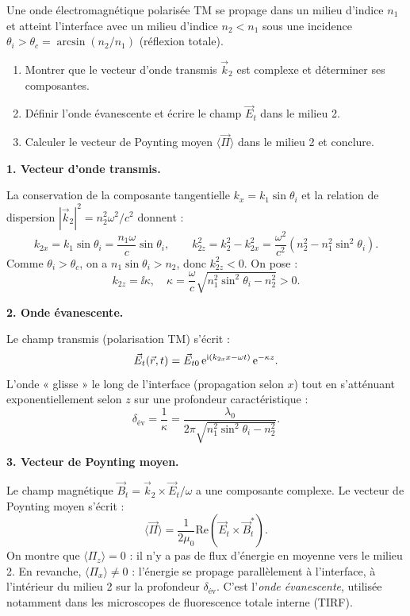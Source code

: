\documentclass[12pt,a4paper]{article}
\begin{document}
\begin{boiteexercice}
Une onde électromagnétique polarisée TM se propage dans un milieu d'indice $n_1$ et atteint l'interface avec un milieu d'indice $n_2 < n_1$ sous une incidence $\theta_i > \theta_c = \arcsin(n_2/n_1)$ (réflexion totale).
\begin{enumerate}
  \item Montrer que le vecteur d'onde transmis $\vec{k}_2$ est complexe et déterminer ses composantes.
  \item Définir l'onde évanescente et écrire le champ $\vec{E}_t$ dans le milieu 2.
  \item Calculer le vecteur de Poynting moyen $\langle\vec{\Pi}\rangle$ dans le milieu 2 et conclure.
\end{enumerate}
\end{boiteexercice}

\begin{boitecorrige}

\textbf{1. Vecteur d'onde transmis.}

La conservation de la composante tangentielle $k_x = k_1\sin\theta_i$ et la relation de dispersion $|\vec{k}_2|^2 = n_2^2 \omega^2/c^2$ donnent :
\[
k_{2x} = k_1\sin\theta_i = \frac{n_1\omega}{c}\sin\theta_i, \qquad k_{2z}^2 = k_2^2 - k_{2x}^2 = \frac{\omega^2}{c^2}(n_2^2 - n_1^2\sin^2\theta_i).
\]
Comme $\theta_i > \theta_c$, on a $n_1\sin\theta_i > n_2$, donc $k_{2z}^2 < 0$. On pose :
\[
k_{2z} = \ii\kappa, \quad \kappa = \frac{\omega}{c}\sqrt{n_1^2\sin^2\theta_i - n_2^2} > 0.
\]

\textbf{2. Onde évanescente.}

Le champ transmis (polarisation TM) s'écrit :
\[
\vec{E}_t(\vec{r},t) = \vec{E}_{t0}\,\mathrm{e}^{\mathrm{i}(k_{2x}x-\omega t)}\,\mathrm{e}^{-\kappa z}.
\]
L'onde « glisse » le long de l'interface (propagation selon $x$) tout en s'atténuant exponentiellement selon $z$ sur une profondeur caractéristique :
\[
\delta_\text{év} = \frac{1}{\kappa} = \frac{\lambda_0}{2\pi\sqrt{n_1^2\sin^2\theta_i - n_2^2}}.
\]

\textbf{3. Vecteur de Poynting moyen.}

Le champ magnétique $\vec{B}_t = \vec{k}_2\times\vec{E}_t/\omega$ a une composante complexe. Le vecteur de Poynting moyen s'écrit :
\[
\langle\vec{\Pi}\rangle = \frac{1}{2\mu_0}\text{Re}\!\left(\vec{E}_t\times\vec{B}_t^*\right).
\]
On montre que $\langle\Pi_z\rangle = 0$ : il n'y a pas de flux d'énergie en moyenne vers le milieu 2. En revanche, $\langle\Pi_x\rangle \neq 0$ : l'énergie se propage parallèlement à l'interface, à l'intérieur du milieu 2 sur la profondeur $\delta_\text{év}$. C'est l'\emph{onde évanescente}, utilisée notamment dans les microscopes de fluorescence totale interne (TIRF).

\end{boitecorrige}
\end{document}
